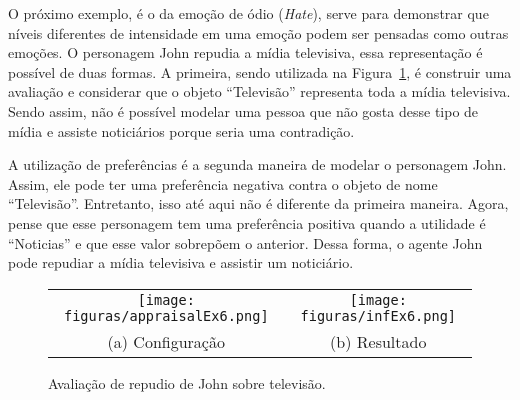 

O próximo exemplo, é o da emoção de ódio (\emph{Hate}), serve para demonstrar
que níveis diferentes de intensidade em uma emoção podem ser pensadas como
outras emoções. O personagem John repudia a mídia televisiva, essa
representação é possível de duas formas. A primeira, sendo utilizada na
Figura~\ref{fig:tp:cdu:ex6}, é construir uma avaliação e considerar que o
objeto ``Televisão'' representa toda a mídia televisiva. Sendo assim,
não é possível modelar uma pessoa que não gosta desse tipo de mídia e assiste
noticiários porque seria uma contradição.

A utilização de preferências é a segunda maneira de modelar o personagem John.
Assim, ele pode ter uma preferência negativa contra o objeto de nome
``Televisão''. Entretanto, isso até aqui não é diferente da primeira maneira.
Agora, pense que esse personagem tem uma preferência positiva quando a
utilidade é ``Noticias'' e que esse valor sobrepõem o anterior. Dessa forma, o
agente John pode repudiar a mídia televisiva e assistir um noticiário.

\begin{figure}
  \centering
  \begin{tabular}{cc}
  \texttt{[image: figuras/appraisalEx6.png]} & \texttt{[image: figuras/infEx6.png]} \\
  (a) Configuração & (b) Resultado
  \end{tabular}
  \caption{Avaliação de repudio de John sobre televisão.}
  \label{fig:tp:cdu:ex6}
\end{figure}


